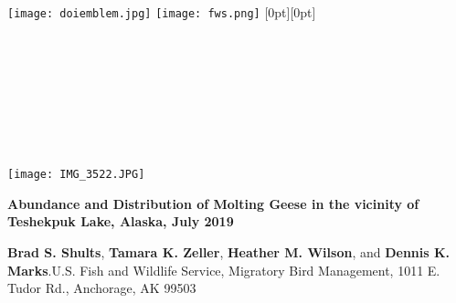 \documentclass[
]{article}
\author{}
\date{\vspace{-2.5em}}
\def\blankpage{%
	\clearpage%
	\thispagestyle{empty}%
	\addtocounter{page}{-1}%
	\null%
	\clearpage}
\begin{document}
	\thispagestyle{empty}
	\texttt{[image: doiemblem.jpg]}
	\hspace{1pt}
	\texttt{[image: fws.png]}
	\hspace{4.28cm}
	\raisebox{33pt}[0pt][0pt]{ %
		\begin{minipage}[t]{25.5pc}
			\colorbox{black}{
				\parbox[l]{25.5pc}{
					\vspace{8pt}
			}}\\[1pc]
			{\fontsize{21}{2\baselineskip}\selectfont {}\\[5pt] \\ \\\\[1pc]}
			{\fontsize{18}{\baselineskip} \selectfont{February 2020}}
	\end{minipage}} \\[2in]
	
	\vspace{1.75in}
	\begin{center}		
		\texttt{[image: IMG\_3522.JPG]}
	\end{center}
\blankpage
\restoregeometry
\pagestyle{fancy}
\renewcommand{\footrulewidth}{1pt}
\renewcommand{\headrulewidth}{0pt}

\large

\textbf{Abundance and Distribution of Molting Geese in the vicinity of Teshekpuk Lake, Alaska, July 2019}
\hfill

\large

\textbf{Brad S. Shults}, \textbf{Tamara K. Zeller},
\textbf{Heather M. Wilson}, and \textbf{Dennis K. Marks}.\newline U.S.
Fish and Wildlife Service, Migratory Bird Management, 1011 E. Tudor Rd.,
Anchorage, AK 99503
\end{document}
